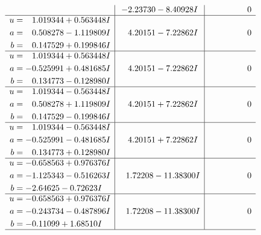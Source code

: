 \documentclass[1p]{elsarticle_modified}
\theoremstyle{definition}
\begin{document}
$$\begin{array}{c|c|c}
 & -2.23730 - 8.40928 I & \phantom{-0.000000 } 0 \\ \hline\begin{aligned}
u &= \phantom{-}1.019344 + 0.563448 I \\
a &= \phantom{-}0.508278 - 1.119809 I \\
b &= \phantom{-}0.147529 + 0.199846 I\end{aligned}
 & \phantom{-}4.20151 - 7.22862 I & \phantom{-0.000000 } 0 \\ \hline\begin{aligned}
u &= \phantom{-}1.019344 + 0.563448 I \\
a &= -0.525991 + 0.481685 I \\
b &= \phantom{-}0.134773 - 0.128980 I\end{aligned}
 & \phantom{-}4.20151 - 7.22862 I & \phantom{-0.000000 } 0 \\ \hline\begin{aligned}
u &= \phantom{-}1.019344 - 0.563448 I \\
a &= \phantom{-}0.508278 + 1.119809 I \\
b &= \phantom{-}0.147529 - 0.199846 I\end{aligned}
 & \phantom{-}4.20151 + 7.22862 I & \phantom{-0.000000 } 0 \\ \hline\begin{aligned}
u &= \phantom{-}1.019344 - 0.563448 I \\
a &= -0.525991 - 0.481685 I \\
b &= \phantom{-}0.134773 + 0.128980 I\end{aligned}
 & \phantom{-}4.20151 + 7.22862 I & \phantom{-0.000000 } 0 \\ \hline\begin{aligned}
u &= -0.658563 + 0.976376 I \\
a &= -1.125343 - 0.516263 I \\
b &= -2.64625 - 0.72623 I\end{aligned}
 & \phantom{-}1.72208 - 11.38300 I & \phantom{-0.000000 } 0 \\ \hline\begin{aligned}
u &= -0.658563 + 0.976376 I \\
a &= -0.243734 - 0.487896 I \\
b &= -0.11099 + 1.68510 I\end{aligned}
 & \phantom{-}1.72208 - 11.38300 I & \phantom{-0.000000 } 0\\
 \hline 
 \end{array}$$\newpage$$\begin{array}{c|c|c}  

\end{array}$$
\end{document}
